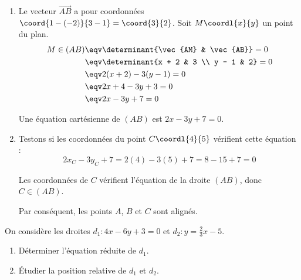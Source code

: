 \begin{correction}
	\nline
	\begin{enumerate}
		\item Le vecteur $\vec{AB}$ a pour coordonnées $\coord{1 - (-2)}{3 - 1} = \coord{3}{2}$. Soit $M\coordl{x}{y}$ un point du plan.
		      \begin{align*}
			      M \in (AB) & \eqv \determinant{\vec{AM}   & \vec{AB}} = 0 \\
			                 & \eqv \determinant{x + 2      & 3             \\ y - 1 & 2} = 0 \\
			                 & \eqv 2(x + 2) - 3(y - 1) = 0                 \\
			                 & \eqv 2x + 4 - 3y + 3 = 0                     \\
			                 & \eqv 2x - 3y + 7 = 0
		      \end{align*}

		      Une équation cartésienne de $(AB)$ est $2x - 3y + 7 = 0$.

		\item Testons si les coordonnées du point $C\coordl{4}{5}$ vérifient cette équation :
		      \[
			      2x_C - 3y_C + 7 = 2(4) - 3(5) + 7 = 8 - 15 + 7 = 0
		      \]

		      Les coordonnées de $C$ vérifient l'équation de la droite $(AB)$, donc $C \in (AB)$.

		      Par conséquent, les points $A$, $B$ et $C$ sont alignés.
	\end{enumerate}
\end{correction}

\begin{exercice}
	On considère les droites $d_1 : 4x - 6y + 3 = 0$ et $d_2 : y = \frac{2}{3}x - 5$.
	\begin{enumerate}
		\item Déterminer l'équation réduite de $d_1$.
		\item Étudier la position relative de $d_1$ et $d_2$.
	\end{enumerate}
\end{exercice}

